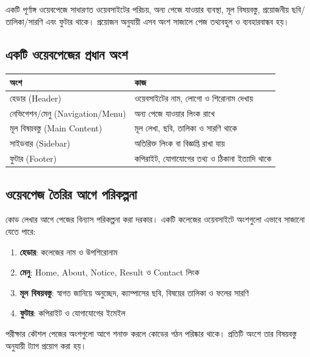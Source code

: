 একটি পূর্ণাঙ্গ ওয়েবপেজে সাধারণত ওয়েবসাইটের পরিচয়, অন্য পেজে যাওয়ার ব্যবস্থা, মূল বিষয়বস্তু, প্রয়োজনীয় ছবি/তালিকা/সারণি এবং ফুটার থাকে। প্রয়োজন অনুযায়ী এসব অংশ সাজালে পেজ তথ্যবহুল ও ব্যবহারবান্ধব হয়।

\subsection{একটি ওয়েবপেজের প্রধান অংশ}

\begin{center}
\begin{tabular}{|p{}|p{}|}
\hline
\textbf{অংশ} & \textbf{কাজ} \\
\hline
হেডার (Header) & ওয়েবসাইটের নাম, লোগো ও শিরোনাম দেখায় \\
\hline
নেভিগেশন/মেনু (Navigation/Menu) & অন্য পেজে যাওয়ার লিংক রাখে \\
\hline
মূল বিষয়বস্তু (Main Content) & মূল লেখা, ছবি, তালিকা ও সারণি থাকে \\
\hline
সাইডবার (Sidebar) & অতিরিক্ত লিংক বা বিজ্ঞপ্তি রাখা যায় \\
\hline
ফুটার (Footer) & কপিরাইট, যোগাযোগের তথ্য ও ঠিকানা ইত্যাদি থাকে \\
\hline
\end{tabular}
\end{center}

\subsection{ওয়েবপেজ তৈরির আগে পরিকল্পনা}

কোড লেখার আগে পেজের বিন্যাস পরিকল্পনা করা দরকার। একটি কলেজের ওয়েবসাইটে অংশগুলো এভাবে সাজানো যেতে পারে:

\begin{enumerate}
\item \textbf{হেডার}: কলেজের নাম ও উপশিরোনাম
\item \textbf{মেনু}: Home, About, Notice, Result ও Contact লিংক
\item \textbf{মূল বিষয়বস্তু}: স্বাগত জানিয়ে অনুচ্ছেদ, ক্যাম্পাসের ছবি, বিষয়ের তালিকা ও ফলের সারণি
\item \textbf{ফুটার}: কপিরাইট ও যোগাযোগের ইমেইল
\end{enumerate}

\begin{keypointbox}{পরীক্ষার কৌশল}
পেজের অংশগুলো আগে শনাক্ত করলে কোডের গঠন পরিষ্কার থাকে। প্রতিটি অংশে তার বিষয়বস্তু অনুযায়ী ট্যাগ প্রয়োগ করা হয়।
\end{keypointbox}

